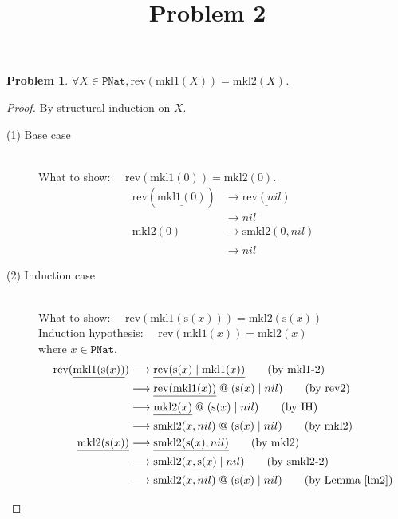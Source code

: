 \documentclass[12pt, a4paper]{article}
\title{Problem 2}
\date{\vspace{-5ex}}
\newtheorem{problem}{Problem}
\newcommand{\rel}[1]{\mathrel{#1}}
\newcommand{\rmx}[1]{\mathrm{#1}}
\newcommand{\larrow}{\longrightarrow}
\newcommand{\under}{\underline}
\begin{document}
\maketitle

\begin{problem}
$\forall X \in \mathtt{PNat}, \rmx{rev}(\rmx{mkl1}(X)) = \rmx{mkl2}(X)$.
\end{problem}
\begin{proof}
By structural induction on $X$.

\begin{description}

\item[(1) Base case]~\\
\noindent
What to show: $\quad\rmx{rev}(\rmx{mkl1}(0)) = \rmx{mkl2}(0)$.
\begin{align*}
\rmx{rev}(\under{\rmx{mkl1}(0)}) &\larrow \under{\rmx{rev}(nil)} \tag{by mkl1-1} \\
	&\larrow nil \tag{by rev1} \\
\under{\rmx{mkl2}(0)} &\larrow \under{\rmx{smkl2}(0, nil)} \tag{by mkl2} \\
	&\larrow nil \tag{by smkl2-1}
\end{align*}

\item[(2) Induction case]~\\
What to show: $\quad\rmx{rev}(\rmx{mkl1}(\rmx{s}(x))) = \rmx{mkl2}(\rmx{s}(x))$ \\
Induction hypothesis: $\quad \rmx{rev}(\rmx{mkl1}(x)) = \rmx{mkl2}(x)$ \\
where $x \in \mathtt{PNat}$.
\begin{align*}
\rmx{rev}(\under{\rmx{mkl1}(\rmx{s}(x))}) 
	&\larrow \under{\rmx{rev}(\rmx{s}(x) \rel{|} \rmx{mkl1}(x))} \tag{by mkl1-2} \\
	&\larrow  \under{\rmx{rev}(\rmx{mkl1}(x))} \rel{@} (\rmx{s}(x) \rel{|} nil)  \tag{by rev2} \\
	&\larrow \under{\rmx{mkl2}(x)} \rel{@} (\rmx{s}(x) \rel{|} nil)  \tag{by IH} \\
	&\larrow \rmx{smkl2}(x, nil) \rel{@} (\rmx{s}(x) \rel{|} nil)  \tag{by mkl2} \\
\under{\rmx{mkl2}(\rmx{s}(x))} 
	&\larrow \under{\rmx{smkl2}(\rmx{s}(x), nil)} \tag{by mkl2} \\
	&\larrow \under{\rmx{smkl2}(x, \rmx{s}(x) \rel{|} nil)} \tag{by smkl2-2} \\
	&\larrow \rmx{smkl2}(x, nil) \rel{@} (\rmx{s}(x) \rel{|} nil) \tag{by Lemma~\ref{lm2}}
\end{align*}

\end{description}
\end{proof}
\end{document}
